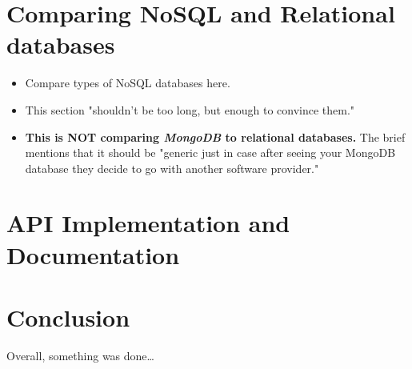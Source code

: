 \documentclass[12pt]{report}
\begin{document}
\chapter{Comparing NoSQL and Relational databases} 
\begin{itemize}
    \item Compare types of NoSQL databases here.
    \item This section "shouldn't be too long, but enough to convince them."
    \item \textbf{This is NOT comparing \textit{MongoDB} to relational databases.} The brief 
    mentions that it should be "generic just in case after seeing your MongoDB database
    they decide to go with another software provider."
\end{itemize}
  



\chapter{API Implementation and Documentation}


\chapter*{Conclusion}

Overall, something was done\dots



\printbibliography
{}
\end{document}
